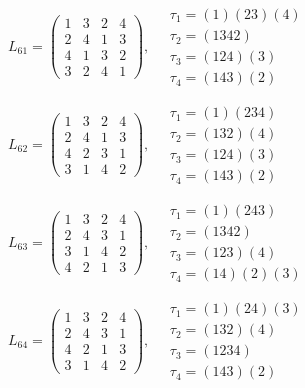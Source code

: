 $L_{61} = \begin{pmatrix} 1 & 3 & 2 & 4 \\ 2 & 4 & 1 & 3 \\ 4 & 1 & 3 & 2 \\ 3 & 2 & 4 & 1 \end{pmatrix}, \quad \begin{matrix} \tau_{1} = (1)(2 3)(4) \\ \tau_{2} = (1 3 4 2) \\ \tau_{3} = (1 2 4)(3) \\ \tau_{4} = (1 4 3)(2) \end{matrix}$

$L_{62} = \begin{pmatrix} 1 & 3 & 2 & 4 \\ 2 & 4 & 1 & 3 \\ 4 & 2 & 3 & 1 \\ 3 & 1 & 4 & 2 \end{pmatrix}, \quad \begin{matrix} \tau_{1} = (1)(2 3 4) \\ \tau_{2} = (1 3 2)(4) \\ \tau_{3} = (1 2 4)(3) \\ \tau_{4} = (1 4 3)(2) \end{matrix}$

$L_{63} = \begin{pmatrix} 1 & 3 & 2 & 4 \\ 2 & 4 & 3 & 1 \\ 3 & 1 & 4 & 2 \\ 4 & 2 & 1 & 3 \end{pmatrix}, \quad \begin{matrix} \tau_{1} = (1)(2 4 3) \\ \tau_{2} = (1 3 4 2) \\ \tau_{3} = (1 2 3)(4) \\ \tau_{4} = (1 4)(2)(3) \end{matrix}$

$L_{64} = \begin{pmatrix} 1 & 3 & 2 & 4 \\ 2 & 4 & 3 & 1 \\ 4 & 2 & 1 & 3 \\ 3 & 1 & 4 & 2 \end{pmatrix}, \quad \begin{matrix} \tau_{1} = (1)(2 4)(3) \\ \tau_{2} = (1 3 2)(4) \\ \tau_{3} = (1 2 3 4) \\ \tau_{4} = (1 4 3)(2) \end{matrix}$

